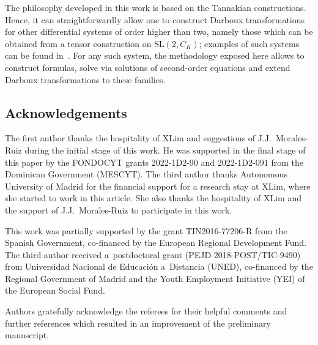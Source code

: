 \documentclass[pdftex]{sigma}%
\numberwithin{equation}{section}
\begin{document}
The philosophy developed in this work is based on the Tannakian constructions. Hence, it can straightforwardly allow one to construct Darboux transformations for other differential systems of order higher than two, namely those which can be obtained from a tensor construction on $\mathrm{SL}(2, C_K)$; examples of such systems can be found in~\cite{CoPl94d}.
For any such system, the methodology exposed here allows to construct formulas, solve via solutions of second-order equations and extend Darboux transformations to these families.

\subsection*{Acknowledgements}

The first author thanks the hospitality of XLim and suggestions of J.J.~Morales-Ruiz during the initial stage of this work.
He was supported in the final stage of this paper by the FONDOCYT grants 2022-1D2-90 and 2022-1D2-091 from the Dominican Government (MESCYT).
The third author thanks Autonomous University of Madrid for the financial support for a research stay at XLim, where she started to work in this article. She also thanks the hospitality of XLim and the support of J.J.~Morales-Ruiz to participate in this work.

This work was partially supported by the grant TIN2016-77206-R from the Spanish Government, co-financed by the European Regional Development Fund. The third author received a~postdoctoral grant (PEJD-2018-POST/TIC-9490) from Universidad Nacional de Educaci\'on a~Distancia (UNED), co-financed by the Regional Government of Madrid and the Youth Employment Initiative (YEI) of the European Social Fund.

Authors gratefully acknowledge the referees for
their helpful comments and further references which resulted in an improvement of the preliminary manuscript.
\end{document}
